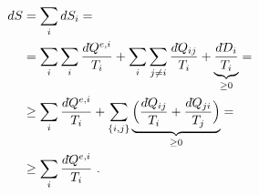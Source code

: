 \documentclass[letterpaper,10pt,english]{jupyterBook}
\begin{document}
\begin{equation*}
\begin{split}\begin{aligned}
  d S & = \sum_i d S_i = \\
      & = \sum_i \sum_i \dfrac{d\hspace{-0.08pt}\bar{}\hspace{0.1pt}  Q^{e,i}}{T_i} + \sum_i \sum_{j \ne i} \dfrac{d\hspace{-0.08pt}\bar{}\hspace{0.1pt}  Q_{ij}}{T_i} + \underbrace{\dfrac{d\hspace{-0.08pt}\bar{}\hspace{0.1pt}  D_i}{T_i}}_{\ge 0} = \\
      & \ge \sum_i \dfrac{d\hspace{-0.08pt}\bar{}\hspace{0.1pt}  Q^{e,i}}{T_i} + \sum_{\{i, j\}} \underbrace{\Big( \dfrac{d\hspace{-0.08pt}\bar{}\hspace{0.1pt}  Q_{ij}}{T_i} + \dfrac{d\hspace{-0.08pt}\bar{}\hspace{0.1pt}  Q_{ji}}{T_j} \Big)}_{ \ge 0 }  = \\
      & \ge \sum_i \dfrac{d\hspace{-0.08pt}\bar{}\hspace{0.1pt}  Q^{e,i}}{T_i} \ .
\end{aligned}\end{split}
\end{equation*}
\sphinxstepscope
\end{document}
